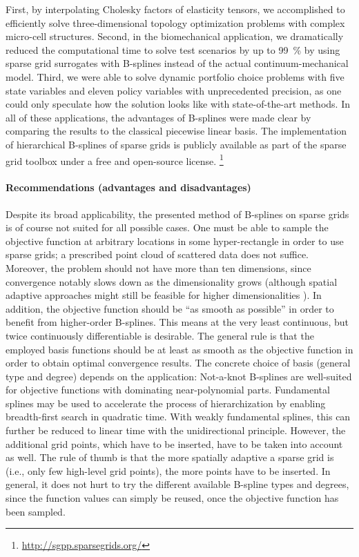 First, by interpolating Cholesky factors of elasticity tensors,
we accomplished to efficiently solve three-dimensional
topology optimization problems with complex micro-cell structures.
Second, in the biomechanical application,
we dramatically reduced the computational time to solve
test scenarios by up to \SI{99}{\percent} by using
sparse grid surrogates with B-splines instead of the
actual continuum-mechanical model.
Third, we were able to solve dynamic portfolio choice problems
with five state variables and eleven policy variables
with unprecedented precision, as one could only speculate
how the solution looks like with state-of-the-art methods.
In all of these applications, the advantages of B-splines were made clear
by comparing the results to the classical piecewise linear basis.
The implementation of hierarchical B-splines of sparse grids is
publicly available as part of the sparse grid toolbox \sgpp
under a free and open-source license.%
\footnote{%
  \url{http://sgpp.sparsegrids.org/}%
}

\paragraph{Recommendations (advantages and disadvantages)}

Despite its broad applicability,
the presented method of B-splines on sparse grids is of course
not suited for all possible cases.
One must be able to sample the objective function at arbitrary
locations in some hyper-rectangle in order to use sparse grids;
a prescribed point cloud of scattered data does not suffice.
Moreover, the problem should not have more than ten dimensions,
since convergence notably slows down as the dimensionality grows
(although spatial adaptive approaches might still be feasible for
higher dimensionalities \cite{Pflueger10Spatially}).
In addition, the objective function should be ``as smooth as possible''
in order to benefit from higher-order B-splines.
This means at the very least continuous,
but twice continuously differentiable is desirable.
The general rule is that the employed basis functions should be
at least as smooth as the objective function in order to obtain
optimal convergence results.
The concrete choice of basis (general type and degree) depends
on the application:
Not-a-knot B-splines are well-suited for objective functions with
dominating near-polynomial parts.
Fundamental splines may be used to accelerate the process of
hierarchization by enabling breadth-first search in quadratic time.
With weakly fundamental splines, this can further be reduced to
linear time with the unidirectional principle.
However, the additional grid points, which have to be inserted,
have to be taken into account as well.
The rule of thumb is that the more spatially adaptive a sparse grid is
(i.e., only few high-level grid points),
the more points have to be inserted.
In general, it does not hurt to try the different available
B-spline types and degrees,
since the function values can simply be reused,
once the objective function has been sampled.


